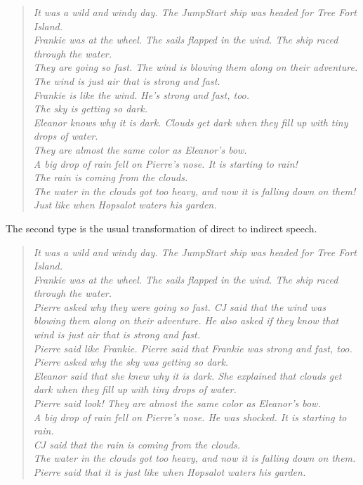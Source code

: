 \begin{verse}
\itshape
It was a wild and windy day. The JumpStart ship was headed for Tree Fort Island. \\
Frankie was at the wheel. The sails flapped in the wind. The ship raced through the water. \\
They are going so fast. The wind is blowing them along on their adventure. The wind is just air that is strong and fast. \\
Frankie is like the wind. He's strong and fast, too. \\
The sky is getting so dark.\\
Eleanor knows why it is dark. Clouds get dark when they fill up with tiny drops of water. \\
They are almost the same color as Eleanor's bow. \\
A big drop of rain fell on Pierre's nose. It is starting to rain! \\
The rain is coming from the clouds. \\
The water in the clouds got too heavy, and now it is falling down on them! \\
Just like when Hopsalot waters his garden. \\
\end{verse}

The second type is the usual transformation of direct to indirect speech. 

\begin{verse}
\itshape
It was a wild and windy day. The JumpStart ship was headed for Tree Fort Island. \\
Frankie was at the wheel. The sails flapped in the wind. The ship raced through the water. \\
Pierre asked why they were going so fast. CJ said that the wind was blowing them along on their adventure. He also asked if they know that wind is just air that is strong and fast. \\
Pierre said like Frankie. Pierre said that Frankie was strong and fast, too. \\
Pierre asked why the sky was getting so dark.\\
Eleanor said that she knew why it is dark. She explained that clouds get dark when they fill up with tiny drops of water.\\
Pierre said look! They are almost the same color as Eleanor's bow. \\
A big drop of rain fell on Pierre's nose. He was shocked. It is starting to rain. \\
CJ said that the rain is coming from the clouds. \\
The water in the clouds got too heavy, and now it is falling down on them. \\
Pierre said that it is just like when Hopsalot waters his garden. \\
\end{verse}
	
